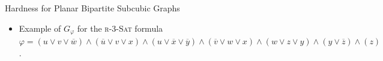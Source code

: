 \documentclass[10pt,aspectratio=169,english]{beamer}
\begin{document}
\begin{frame}{Hardness for Planar Bipartite Subcubic Graphs}
	\begin{minipage}{0.5\textwidth}
		\begin{itemize}
			\item Example of $G_{\varphi}$ for the \textsc{r-3-Sat} formula $\varphi = (u \lor v \lor \overline{w}) \land (\overline{u} \lor v \lor x) \land (u \lor \overline{x} \lor \overline{y}) \land (\overline{v} \lor w \lor x) \land (w \lor z \lor y) \land (y \lor \overline{z}) \land (z)$.
		\end{itemize}
	\end{minipage}\begin{minipage}{0.5\textwidth}
		\begin{figure}[h]
			\centering
			\resizebox{.9\linewidth}{!}{\begin{tikzpicture}[thick,
				every node/.style={draw,circle},
				label distance=-1mm,
				node distance=2cm,
				]
				

\end{tikzpicture}}
\end{figure}
\end{minipage}
\end{frame}
\end{document}
